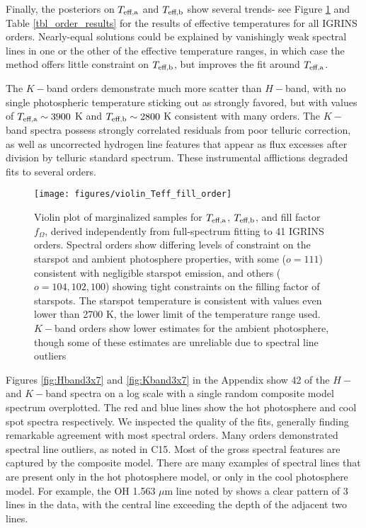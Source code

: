 \documentclass[twocolumn]{emulateapj}%
\newcommand{\iancze}{{\sc C15}}
\begin{document}
Finally, the posteriors on $T_\textrm{eff,a}$ and $T_\textrm{eff,b}$ show several trends- see Figure \ref{fig:TwoTempResults} and Table \ref{tbl_order_results} for the results of effective temperatures for all IGRINS orders.  
Nearly-equal solutions could be explained by vanishingly weak spectral lines in one or the other of the effective temperature ranges, in which case the method offers little constraint on $T_\textrm{eff,b}$, but improves the fit around $T_\textrm{eff,a}$.  

The $K-$band orders demonstrate much more scatter than $H-$band, with no single photospheric temperature sticking out as strongly favored, but with values of $T_\textrm{eff,a} \sim 3900$ K and $T_\textrm{eff,b} \sim 2800$ K consistent with many orders.  The $K-$band spectra possess strongly correlated residuals from poor telluric correction, as well as uncorrected hydrogen line features that appear as flux excesses after division by telluric standard spectrum.  These instrumental afflictions degraded fits to several orders.



\begin{figure*}
	\centering
	\texttt{[image: figures/violin\_Teff\_fill\_order]} 
	\caption{Violin plot of marginalized samples for $T_\textrm{eff,a}$, $T_\textrm{eff,b}$, and fill factor $f_{\Omega}$, derived independently from full-spectrum fitting to 41 IGRINS orders.  Spectral orders show differing levels of constraint on the starspot and ambient photosphere properties, with some ($o=111$) consistent with negligible starspot emission, and others ($o=104, 102, 100$) showing tight constraints on the filling factor of starspots.  The starspot temperature is consistent with values even lower than 2700 K, the lower limit of the temperature range used.  $K-$band orders show lower estimates for the ambient photosphere, though some of these estimates are unreliable due to spectral line outliers}
	\label{fig:TwoTempResults}
\end{figure*}


Figures \ref{fig:Hband3x7} and \ref{fig:Kband3x7} in the Appendix show 42 of the $H-$ and $K-$band spectra on a log scale with a single random composite model spectrum overplotted.  The red and blue lines show the hot photosphere and cool spot spectra respectively.  We inspected the quality of the fits, generally finding remarkable agreement with most spectral orders.  Many orders demonstrated spectral line outliers, as noted in \iancze.  Most of the gross spectral features are captured by the composite model.  There are many examples of spectral lines that are present only in the hot photosphere model, or only in the cool photosphere model.  For example, the OH 1.563 $\mu$m line noted by \citet{oneal01} shows a clear pattern of 3 lines in the data, with the central line exceeding the depth of the adjacent two lines.  
\end{document}
